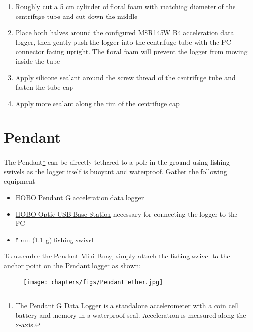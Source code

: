 \documentclass[
  letterpaper,
  DIV=11,
  numbers=noendperiod]{scrreprt}
\providecommand{\tightlist}{%
  \setlength{\itemsep}{0pt}\setlength{\parskip}{0pt}}\usepackage{longtable,booktabs,array}
\begin{document}
\begin{enumerate}
\def\labelenumi{\arabic{enumi}.}
\setcounter{enumi}{15}
\tightlist
\item
  Roughly cut a 5 cm cylinder of floral foam with matching diameter of
  the centrifuge tube and cut down the middle
\item
  Place both halves around the configured MSR145W B4 acceleration data
  logger, then gently push the logger into the centrifuge tube with the
  PC connector facing upright. The floral foam will prevent the logger
  from moving inside the tube
\item
  Apply silicone sealant around the screw thread of the centrifuge tube
  and fasten the tube cap
\item
  Apply more sealant along the rim of the centrifuge cap
\end{enumerate}

\hypertarget{pendant}{%
\section{Pendant}\label{pendant}}

The Pendant\footnote{The Pendant G Data Logger is a standalone
  accelerometer with a coin cell battery and memory in a waterproof
  seal. Acceleration is measured along the x-axis.} can be directly
tethered to a pole in the ground using fishing swivels as the logger
itself is buoyant and waterproof. Gather the following equipment:

\begin{itemize}
\tightlist
\item
  \href{https://www.onsetcomp.com/products/data-loggers/ua-004-64/}{HOBO
  Pendant G} acceleration data logger
\item
  \href{https://www.onsetcomp.com/products/communications/base-u-4}{HOBO
  Optic USB Base Station} necessary for connecting the logger to the PC
\item
  5 cm (1.1 g) fishing swivel
\end{itemize}

To assemble the Pendant Mini Buoy, simply attach the fishing swivel to
the anchor point on the Pendant logger as shown:

\begin{figure}

{\centering \texttt{[image: chapters/figs/PendantTether.jpg]}

}

\end{figure}
\end{document}
